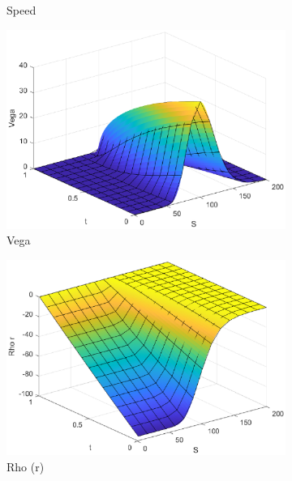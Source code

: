 \begin{figure}[H]
\begin{subfigure}[b]{0.35\linewidth}
        \caption{Speed}
    \end{subfigure}
    \begin{subfigure}[b]{0.35\linewidth}
        \includegraphics[width=\linewidth]{Imagenes/Parte1/6_Sols/Put/Put_Vega.eps}
        \caption{Vega}
    \end{subfigure}
    \begin{subfigure}[b]{0.35\linewidth}
        \includegraphics[width=\linewidth]{Imagenes/Parte1/6_Sols/Put/Put_Rho_r.eps}
        \caption{Rho (r)}
    \end{subfigure}
    \begin{subfigure}[b]{0.35\linewidth}

\end{subfigure}
\end{figure}
